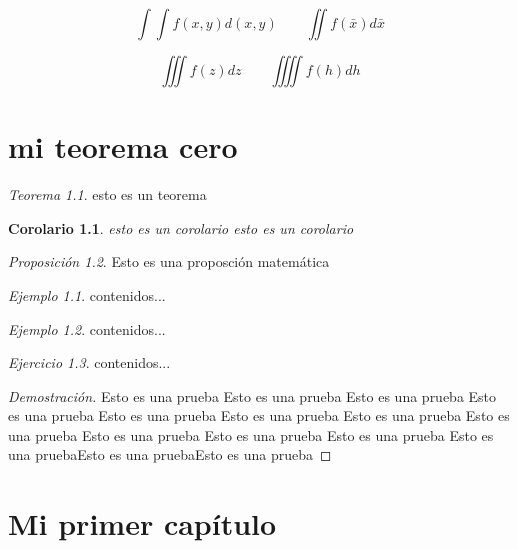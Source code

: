 \documentclass{report}
\newtheorem*{cor}{Corolario}
\theoremstyle{remark}%
\newtheorem{ej}{Ejemplo}
\newtheorem{ejr}[ej]{Ejercicio}%
\newtheorem{teo}{Teorema}[chapter]%
\newtheorem{prop}[teo]{Proposición}
\begin{document}
$$
\int\int f(x,y) d(x,y)\qquad\iint f(\bar{x})d\bar{x}%
$$

$$
\iiint f(z)dz\qquad\iiiint f(h)dh
$$%
\chapter{mi teorema cero}%
\begin{teo}%
	esto es un teorema
\end{teo}

\begin{cor}
esto es un corolario esto es un corolario
\end{cor}

\begin{prop}
Esto es una proposción matemática
\end{prop}

\begin{ej}
	contenidos...
\end{ej}

\begin{ej}
	contenidos...
\end{ej}

\begin{ejr}
	contenidos...
\end{ejr}

\renewcommand{\qedsymbol}{\color{red}$\heartsuit$}%
\begin{proof}[Demostración]
Esto es una prueba Esto es una prueba Esto es una prueba Esto es una prueba Esto es una prueba Esto es una prueba Esto es una prueba Esto es una prueba Esto es una prueba Esto es una prueba Esto es una prueba Esto es una pruebaEsto es una pruebaEsto es una prueba%
\end{proof}
\newpage

\tableofcontents

\setcounter{chapter}{5} %

\chapter{Mi primer capítulo}
\end{document}
